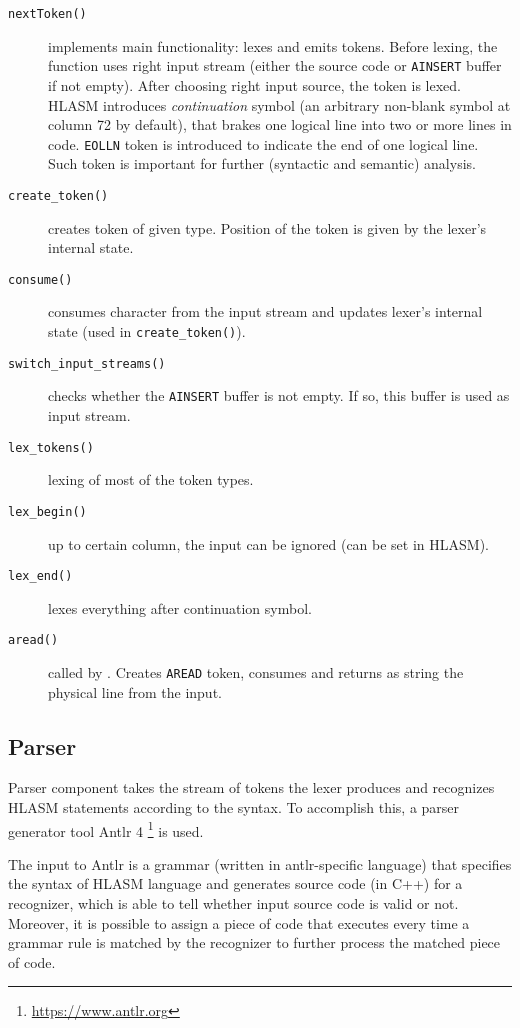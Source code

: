 \begin{description}
		\begin{description}
			\item[\texttt{nextToken()}] implements main functionality: lexes and emits tokens. Before lexing, the function uses right input stream (either the source code or \texttt{AINSERT} buffer if not empty). After choosing right input source, the token is lexed. HLASM introduces \textit{continuation} symbol (an arbitrary non-blank symbol at column 72 by default), that brakes one logical line into two or more lines in code. \texttt{EOLLN} token is introduced to indicate the end of one logical line. Such token is important for further (syntactic and semantic) analysis.
			
			\item[\texttt{create\_token()}] creates token of given type. Position of the token is given by the lexer's internal state. 
			
			\item[\texttt{consume()}] consumes character from the input stream and updates lexer's internal state (used in \texttt{create\_token()}).
			
			\item[\texttt{switch\_input\_streams()}] checks whether the \texttt{AINSERT} buffer is not empty. If so, this buffer is used as input stream.
			
			\item[\texttt{lex\_tokens()}] lexing of most of the token types.
			
			\item[\texttt{lex\_begin()}] up to certain column, the input can be ignored (can be set in HLASM).
			
			\item[\texttt{lex\_end()}] lexes everything after continuation symbol.
			
			\item[\texttt{aread()}] called by . Creates \texttt{AREAD} token, consumes and returns as string the physical line from the input.
			
		\end{description}
		
\end{description}


\subsection{Parser}

Parser component takes the stream of tokens the lexer produces and recognizes HLASM statements according to the syntax. To accomplish this, a parser generator tool Antlr 4 \footnote{\url{https://www.antlr.org}} is used.

The input to Antlr is a grammar (written in antlr-specific language) that specifies the syntax of HLASM language and generates source code (in C++) for a recognizer, which is able to tell whether input source code is valid or not. Moreover, it is possible to assign a piece of code that executes every time a grammar rule is matched by the recognizer to further process the matched piece of code.
